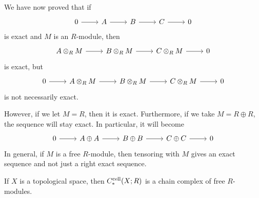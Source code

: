 \documentclass{standalone}
\begin{document}
We have now proved that if
\[
  \begin{tikzcd}
    0 \ar[r] &
    A \ar[r] &
    B \ar[r] &
    C \ar[r] &
    0
  \end{tikzcd}
\]
is exact and \(M\) is an \(R\)-module, then
\[
  \begin{tikzcd}
    A \otimes_R M \ar[r] &
    B \otimes_R M \ar[r] &
    C \otimes_R M \ar[r] &
    0
  \end{tikzcd}
\]
is exact, but
\[
  \begin{tikzcd}
    0 \ar[r] &
    A \otimes_R M \ar[r] &
    B \otimes_R M \ar[r] &
    C \otimes_R M \ar[r] &
    0
  \end{tikzcd}
\]
is not necessarily exact.

However, if we let \(M = R\), then it is exact.
Furthermore, if we take \(M = R \oplus R\), the sequence will stay exact.
In particular, it will become
\[
  \begin{tikzcd}
    0 \arrow[r] &
    A \oplus A \arrow[r] &
    B \oplus B \arrow[r] &
    C \oplus C \arrow[r] &
    0
  \end{tikzcd}
\]
In general, if \(M\) is a free \(R\)-module, then tensoring with \(M\)
gives an exact sequence and not just a right exact sequence.

\begin{note}
  If \(X\) is a topological space, then \(C^{\text{cell}}_*(X; R)\) is
  a chain complex of free \(R\)-modules.
\end{note}
\end{document}

